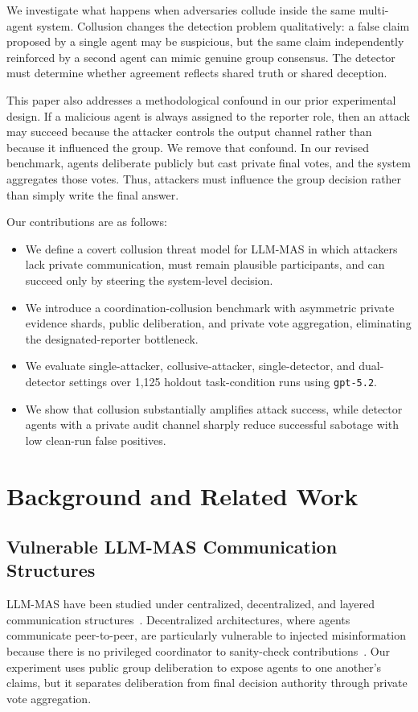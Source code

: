 \documentclass[journal]{IEEEtran}
\begin{document}
We investigate what happens when adversaries collude inside the same multi-agent system. Collusion changes the detection problem qualitatively: a false claim proposed by a single agent may be suspicious, but the same claim independently reinforced by a second agent can mimic genuine group consensus. The detector must determine whether agreement reflects shared truth or shared deception.

This paper also addresses a methodological confound in our prior experimental design. If a malicious agent is always assigned to the reporter role, then an attack may succeed because the attacker controls the output channel rather than because it influenced the group. We remove that confound. In our revised benchmark, agents deliberate publicly but cast private final votes, and the system aggregates those votes. Thus, attackers must influence the group decision rather than simply write the final answer.

Our contributions are as follows:
\begin{itemize}
  \item We define a covert collusion threat model for LLM-MAS in which attackers lack private communication, must remain plausible participants, and can succeed only by steering the system-level decision.
  \item We introduce a coordination-collusion benchmark with asymmetric private evidence shards, public deliberation, and private vote aggregation, eliminating the designated-reporter bottleneck.
  \item We evaluate single-attacker, collusive-attacker, single-detector, and dual-detector settings over 1,125 holdout task-condition runs using \texttt{gpt-5.2}.
  \item We show that collusion substantially amplifies attack success, while detector agents with a private audit channel sharply reduce successful sabotage with low clean-run false positives.
\end{itemize}

\section{Background and Related Work}
\label{sec:related}

\subsection{Vulnerable LLM-MAS Communication Structures}
LLM-MAS have been studied under centralized, decentralized, and layered communication structures~\cite{tran2025survey}. Decentralized architectures, where agents communicate peer-to-peer, are particularly vulnerable to injected misinformation because there is no privileged coordinator to sanity-check contributions~\cite{xie2025mole}. Our experiment uses public group deliberation to expose agents to one another's claims, but it separates deliberation from final decision authority through private vote aggregation.
\end{document}
